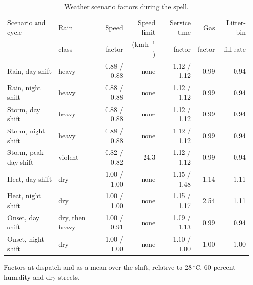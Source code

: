 \begin{table}[!htbp]
\caption{Weather scenario factors during the spell.}
\label{tab:scenarios}
\centering
\small
\setlength{\tabcolsep}{4pt}
\begin{tabular}{>{\raggedright\arraybackslash}p{}lrrrrr}
\toprule
Scenario and cycle & Rain & Speed & Speed limit & Service time & Gas & Litter-bin \\
 & class & factor & (km\,h$^{-1}$) & factor & factor & fill rate \\
\midrule
Rain, day shift & heavy & 0.88 / 0.88 & none & 1.12 / 1.12 & 0.99 & 0.94 \\
Rain, night shift & heavy & 0.88 / 0.88 & none & 1.12 / 1.12 & 0.99 & 0.94 \\
Storm, day shift & heavy & 0.88 / 0.88 & none & 1.12 / 1.12 & 0.99 & 0.94 \\
Storm, night shift & heavy & 0.88 / 0.88 & none & 1.12 / 1.12 & 0.99 & 0.94 \\
Storm, peak day shift & violent & 0.82 / 0.82 & 24.3 & 1.12 / 1.12 & 0.99 & 0.94 \\
Heat, day shift & dry & 1.00 / 1.00 & none & 1.15 / 1.48 & 1.14 & 1.11 \\
Heat, night shift & dry & 1.00 / 1.00 & none & 1.15 / 1.17 & 2.54 & 1.11 \\
Onset, day shift & dry, then heavy & 1.00 / 0.91 & none & 1.09 / 1.13 & 0.99 & 0.94 \\
Onset, night shift & dry & 1.00 / 1.00 & none & 1.00 / 1.00 & 1.00 & 1.00 \\
\bottomrule
\end{tabular}
\par\smallskip\footnotesize Factors at dispatch and as a mean over the shift, relative to 28\,$^\circ$C, 60 percent humidity and dry streets.
\end{table}
